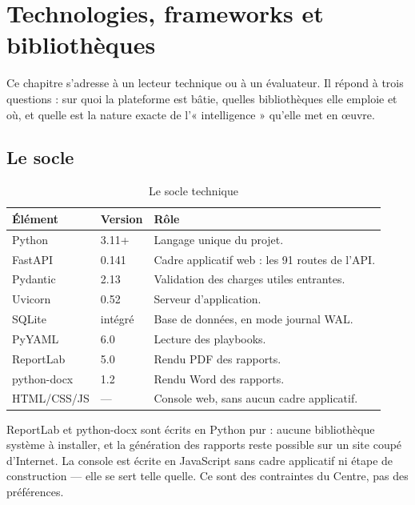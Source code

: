 \chapter{Technologies, frameworks et bibliothèques}
\minitoc

Ce chapitre s'adresse à un lecteur technique ou à un évaluateur. Il répond à
trois questions : sur quoi la plateforme est bâtie, quelles bibliothèques elle
emploie et où, et quelle est la nature exacte de l'« intelligence » qu'elle met
en œuvre.

\section{Le socle}

\begin{table}[h]
\centering
\begin{tabular}{@{}p{3.6cm}p{2.4cm}p{7.8cm}@{}}
\toprule
\textbf{Élément} & \textbf{Version} & \textbf{Rôle} \\
\midrule
Python & 3.11+ & Langage unique du projet. \\[5pt]
FastAPI & 0.141 & Cadre applicatif web : les 91 routes de l'API. \\[5pt]
Pydantic & 2.13 & Validation des charges utiles entrantes. \\[5pt]
Uvicorn & 0.52 & Serveur d'application. \\[5pt]
SQLite & intégré & Base de données, en mode journal WAL. \\[5pt]
PyYAML & 6.0 & Lecture des playbooks. \\[5pt]
ReportLab & 5.0 & Rendu PDF des rapports. \\[5pt]
python-docx & 1.2 & Rendu Word des rapports. \\[5pt]
HTML/CSS/JS & --- & Console web, sans aucun cadre applicatif. \\
\bottomrule
\end{tabular}
\caption{Le socle technique}
\end{table}

\begin{tcolorbox}[colback=green!4!white, colframe=darkgreen,
  title=\textbf{Bon à savoir --- pourquoi si peu de dépendances},
  fonttitle=\bfseries, boxrule=0.6pt]
ReportLab et python-docx sont écrits en Python pur : aucune bibliothèque
système à installer, et la génération des rapports reste possible sur un site
coupé d'Internet. La console est écrite en JavaScript sans cadre applicatif ni
étape de construction — elle se sert telle quelle. Ce sont des contraintes du
Centre, pas des préférences.
\end{tcolorbox}

